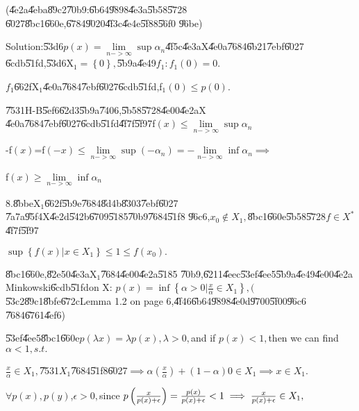 \documentclass{article}
\begin{document}
(\U{4e2a}\U{4eba}\U{89c2}\U{70b9}:\U{6b64}\U{9898}\U{4e3a}\U{5b58}\U{5728}%
\U{6027}\U{8bc1}\U{660e},\U{6784}\U{9020}\U{4f3c}\U{4e4e}\U{5f88}\U{56f0}%
\U{96be})

Solution:\bigskip \U{53d6}$p\left( x\right) =\underset{n->\infty }{\lim }%
\sup \alpha _{n}$\U{4f5c}\U{4e3a}X\U{4e0a}\U{7684}\U{6b21}\U{7ebf}\U{6027}%
\U{6cdb}\U{51fd},\U{53d6}X$_{1}=\left\{ 0\right\} ,$\U{5b9a}\U{4e49}$%
f_{1}:f_{1}\left( 0\right) =0.$

$f_{1}$\U{662f}X$_{1}$\U{4e0a}\U{7684}\U{7ebf}\U{6027}\U{6cdb}\U{51fd},f$%
_{1}\left( 0\right) \leq p\left( 0\right) .$

\U{7531}H-B\U{5ef6}\U{62d3}\U{5b9a}\U{7406},\U{5b58}\U{5728}\U{4e00}\U{4e2a}X%
\U{4e0a}\U{7684}\U{7ebf}\U{6027}\U{6cdb}\U{51fd}\U{4f7f}\U{5f97}f$\left(
x\right) \leq \underset{n->\infty }{\lim }\sup \alpha _{n}$

-f$\left( x\right) $=f$\left( -x\right) \leq \underset{n->\infty }{\lim }%
\sup \left( -\alpha _{n}\right) =-\underset{n->\infty }{\lim }\inf \alpha
_{n}\implies $

f$\left( x\right) \geq \underset{n->\infty }{\lim }\inf \alpha _{n}$

8.\U{8bbe}X$_{1}$\U{662f}\U{5b9e}\U{7684}\U{8d4b}\U{8303}\U{7ebf}\U{6027}%
\U{7a7a}\U{95f4}X\U{4e2d}\U{542b}\U{6709}\U{5185}\U{70b9}\U{7684}\U{51f8}%
\U{96c6},$x_{0}\notin X_{1},$\U{8bc1}\U{660e}\U{5b58}\U{5728}$f\in X^{\ast }$%
\U{4f7f}\U{5f97}

$\sup \left\{ f\left( x\right) |x\in X_{1}\right\} \leq 1\leq f\left(
x_{0}\right) .$

\U{8bc1}\U{660e},\U{82e5}0\U{4e3a}X$_{1}$\U{7684}\U{4e00}\U{4e2a}\U{5185}%
\U{70b9},\U{6211}\U{4eec}\U{53ef}\U{4ee5}\U{5b9a}\U{4e49}\U{4e00}\U{4e2a}%
Minkowski\U{6cdb}\U{51fd}on X: $p\left( x\right) =\inf \left\{ \alpha >0|%
\frac{x}{\alpha }\in X_{1}\right\} ,($\U{53c2}\U{89c1}\U{8bfe}\U{672c}Lemma
1.2 on page 6,\U{4f46}\U{6b64}\U{9898}\U{4e0d}\U{9700}\U{5f00}\U{96c6}%
\U{7684}\U{6761}\U{4ef6})

\bigskip \U{53ef}\U{4ee5}\U{8bc1}\U{660e}$p\left( \lambda x\right) =\lambda
p\left( x\right) ,\lambda >0,$and if $p\left( x\right) <1,$then we can find $%
\alpha <1,s.t.$

$\frac{x}{\alpha }\in X_{1},$\U{7531}$X_{1}$\U{7684}\U{51f8}\U{6027}$%
\implies \alpha \left( \frac{x}{\alpha }\right) +\left( 1-\alpha \right)
0\in X_{1}\implies x\in X_{1}.$

$\forall p\left( x\right) ,p\left( y\right) $,$\epsilon >0,$since $p\left( 
\frac{x}{p\left( x\right) +\epsilon }\right) =\frac{p\left( x\right) }{%
p\left( x\right) +\epsilon }<1\implies \frac{x}{p\left( x\right) +\epsilon }%
\in X_{1},$
\end{document}
